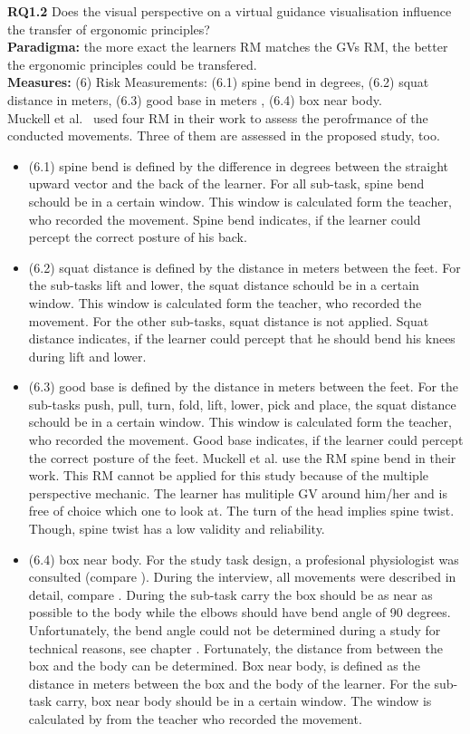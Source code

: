\textbf{RQ1.2} Does the visual perspective on a virtual guidance visualisation influence the transfer of ergonomic principles?\\
\textbf{Paradigma:} the more exact the learners RM matches the GVs RM, the better the ergonomic principles could be transfered.\\
\textbf{Measures:} (6) Risk Measurements: (6.1) spine bend in degrees, (6.2) squat distance in meters, (6.3) good base in meters , (6.4) box near body.\\
Muckell et al.~\cite{muckell} used four RM in their work to assess the perofrmance of the conducted movements. Three of them are assessed in the proposed study, too.
\begin{itemize}
\item[] (6.1) spine bend is defined by the difference in degrees between the straight upward vector and the back of the learner. For all sub-task, spine bend schould be in a certain window. This window is calculated form the teacher, who recorded the movement. Spine bend indicates, if the learner could percept the correct posture of his back.

\item[] (6.2) squat distance is defined by the distance in meters between the feet. For the sub-tasks lift and lower, the squat distance schould be in a certain window. This window is calculated form the teacher, who recorded the movement. For the other sub-tasks, squat distance is not applied. Squat distance indicates, if the learner could percept that he should bend his knees during lift and lower.

\item[] (6.3) good base is defined by the distance in meters between the feet. For the sub-tasks push, pull, turn, fold, lift, lower, pick and place, the squat distance schould be in a certain window. This window is calculated form the teacher, who recorded the movement. Good base indicates, if the learner could percept the correct posture of the feet.
Muckell et al.\cite{muckell} use the RM spine bend in their work. This RM cannot be applied for this study because of the multiple perspective mechanic. The learner has mulitiple GV around him/her and is free of choice which one to look at. The turn of the head implies spine twist. Though, spine twist has a low validity and reliability.

\item[] (6.4) box near body. For the study task design, a profesional physiologist was consulted (compare ). During the interview, all movements were described in detail, compare . During the sub-task carry the box should be as near as possible to the body while the elbows should have bend angle of 90 degrees. Unfortunately, the bend angle could not be determined during a study for technical reasons, see chapter . Fortunately, the distance from between the box and the body can be determined. Box near body, is defined as the distance in meters between the box and the body of the learner. For the sub-task carry, box near body should be in a certain window. The window is calculated by from the teacher who recorded the movement.
\end{itemize}

